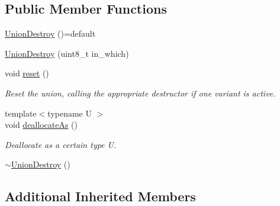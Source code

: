 \subsection*{Public Member Functions}
\begin{DoxyCompactItemize}
\item 
\hyperlink{structvt_1_1util_1_1adt_1_1_union_destroy_3_01_t_00_01typename_01std_1_1enable__if__t_3_01not_0117947c5b8b44b7d9f4a4df27d8795277_a0f3007f8555c38fa8f73ad4b99896b31}{Union\+Destroy} ()=default
\item 
\hyperlink{structvt_1_1util_1_1adt_1_1_union_destroy_3_01_t_00_01typename_01std_1_1enable__if__t_3_01not_0117947c5b8b44b7d9f4a4df27d8795277_a081c5ab9e9d8edbb8191efb1c5d45f38}{Union\+Destroy} (uint8\+\_\+t in\+\_\+which)
\item 
void \hyperlink{structvt_1_1util_1_1adt_1_1_union_destroy_3_01_t_00_01typename_01std_1_1enable__if__t_3_01not_0117947c5b8b44b7d9f4a4df27d8795277_ae29f61c7a4b821e0e451abe253a8a367}{reset} ()
\begin{DoxyCompactList}\small\item\em Reset the union, calling the appropriate destructor if one variant is active. \end{DoxyCompactList}\item 
{\footnotesize template$<$typename U $>$ }\\void \hyperlink{structvt_1_1util_1_1adt_1_1_union_destroy_3_01_t_00_01typename_01std_1_1enable__if__t_3_01not_0117947c5b8b44b7d9f4a4df27d8795277_a699eec83059ebb0e747ac7549e2aaf29}{deallocate\+As} ()
\begin{DoxyCompactList}\small\item\em Deallocate as a certain type {\ttfamily U}. \end{DoxyCompactList}\item 
\hyperlink{structvt_1_1util_1_1adt_1_1_union_destroy_3_01_t_00_01typename_01std_1_1enable__if__t_3_01not_0117947c5b8b44b7d9f4a4df27d8795277_a63ff918204bcd7a80361d617ead98c24}{$\sim$\+Union\+Destroy} ()
\end{DoxyCompactItemize}
\subsection*{Additional Inherited Members}


